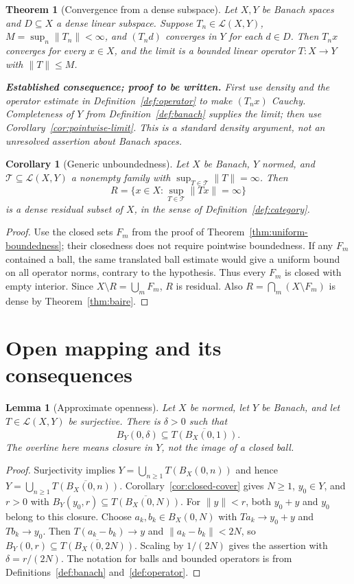 \documentclass[11pt,a4paper]{article}
\theoremstyle{definition}
\theoremstyle{plain}
\newtheorem{theorem}[definition]{Theorem}
\newtheorem{lemma}[definition]{Lemma}
\newtheorem{corollary}[definition]{Corollary}
\newcommand{\norm}[1]{\lVert #1\rVert}
\begin{document}
\begin{theorem}[Convergence from a dense subspace]\label{thm:dense-convergence}
Let $X,Y$ be Banach spaces and $D\subseteq X$ a dense linear subspace.
Suppose $T_n\in\mathcal L(X,Y)$, $M=\sup_n\norm{T_n}<\infty$, and
$(T_nd)$ converges in $Y$ for each $d\in D$. Then $T_nx$ converges
for every $x\in X$, and the limit is a bounded linear operator $T:X\to Y$
with $\norm{T}\le M$.

\normalfont\smallskip
\textbf{Established consequence; proof to be written.}
First use density and the operator estimate in
Definition~\ref{def:operator} to make $(T_nx)$ Cauchy. Completeness of
$Y$ from Definition~\ref{def:banach} supplies the limit; then use
Corollary~\ref{cor:pointwise-limit}. This is a standard density argument,
not an unresolved assertion about Banach spaces.
\end{theorem}

\begin{corollary}[Generic unboundedness]\label{cor:generic-unboundedness}
Let $X$ be Banach, $Y$ normed, and
$\mathcal T\subseteq\mathcal L(X,Y)$ a nonempty family with
$\sup_{T\in\mathcal T}\norm{T}=\infty$. Then
\[
 R=\{x\in X:\sup_{T\in\mathcal T}\norm{Tx}=\infty\}
\]
is a dense residual subset of $X$, in the sense of
Definition~\ref{def:category}.
\end{corollary}
\begin{proof}
Use the closed sets $F_m$ from the proof of
Theorem~\ref{thm:uniform-boundedness}; their closedness does not require
pointwise boundedness. If any $F_m$ contained a ball, the same translated
ball estimate would give a uniform bound on all operator norms,
contrary to the hypothesis. Thus every $F_m$ is closed with empty
interior. Since $X\setminus R=\bigcup_mF_m$, $R$ is residual.
Also $R=\bigcap_m(X\setminus F_m)$ is dense by Theorem~\ref{thm:baire}.
\end{proof}

\section{Open mapping and its consequences}

\begin{lemma}[Approximate openness]\label{lem:approximate-open}
Let $X$ be normed, let $Y$ be Banach, and let
$T\in\mathcal L(X,Y)$ be surjective. There is $\delta>0$ such that
\[
 B_Y(0,\delta)\subseteq\overline{T(B_X(0,1))}.
\]
The overline here means closure in $Y$, not the image of a closed ball.
\end{lemma}
\begin{proof}
Surjectivity implies $Y=\bigcup_{n\ge1}T(B_X(0,n))$ and hence
$Y=\bigcup_{n\ge1}\overline{T(B_X(0,n))}$.
Corollary~\ref{cor:closed-cover} gives $N\ge1$, $y_0\in Y$, and $r>0$
with $B_Y(y_0,r)\subseteq\overline{T(B_X(0,N))}$.
For $\norm{y}<r$, both $y_0+y$ and $y_0$ belong to this closure.
Choose $a_k,b_k\in B_X(0,N)$ with $Ta_k\to y_0+y$ and $Tb_k\to y_0$.
Then $T(a_k-b_k)\to y$ and $\norm{a_k-b_k}<2N$, so
$B_Y(0,r)\subseteq\overline{T(B_X(0,2N))}$.
Scaling by $1/(2N)$ gives the assertion with $\delta=r/(2N)$.
The notation for balls and bounded operators is from
Definitions~\ref{def:banach} and~\ref{def:operator}.
\end{proof}
\end{document}
